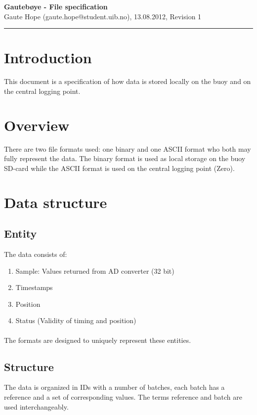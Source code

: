 \documentclass[a4paper]{article}
\newcommand{\makeheading}[2]%
        {\hspace*{-\marginparsep minus \marginparwidth}%
         \begin{minipage}[t]{\textwidth\marginparwidth\marginparsep}%
           {\large \bfseries #1}\\{#2}\\[-0.15\baselineskip]%
                 \rule{\columnwidth}{1pt}%
         \end{minipage}}
\begin{document}
\makeheading{Gautebøye - File specification}{Gaute Hope
(gaute.hope@student.uib.no), 13.08.2012, Revision 1}

\vspace{2em}
\section*{Introduction}
This document is a specification of how data is stored locally on the
buoy and on the central logging point.

\vspace{2em}

\begin{multicols}{2}
  \section{Overview}
  There are two file formats used: one binary
  and one ASCII format who both may fully represent the data.
  The binary format is used as local storage on the
  buoy SD-card while the ASCII format is used on the central logging point
  (Zero).

  \section{Data structure}
    \subsection{Entity}
    The data consists of:
    \begin{enumerate}
      \item Sample: Values returned from AD converter (32 bit)
      \item Timestamps
      \item Position
      \item Status (Validity of timing and position)
    \end{enumerate}

    \paragraph{} The formats are designed to uniquely represent these
    entities.

    \subsection{Structure}
    The data is organized in IDs with a number of batches, each batch
    has a reference and a set of corresponding values. The terms reference and
    batch are used interchangeably.


\end{multicols}
\end{document}
